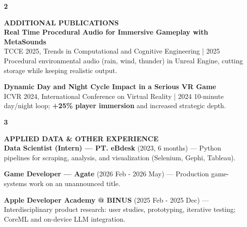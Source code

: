 \documentclass[11pt,a4paper]{article}
\begin{document}
\begin{minipage}[t]{18cm}
\begin{minipage}[t]{17cm}
\end{minipage}

\vspace{0.6cm}

\begin{minipage}[t]{0.8cm}
{\Large\bfseries 2}
\end{minipage}%
\begin{minipage}[t]{17cm}
{\large\bfseries ADDITIONAL PUBLICATIONS}\\[8pt]

\textbf{Real Time Procedural Audio for Immersive Gameplay with MetaSounds}\\
{\small TCCE 2025, Trends in Computational and Cognitive Engineering | 2025 \textbar{} Procedural environmental audio (rain, wind, thunder) in Unreal Engine, cutting storage while keeping realistic output.}

\vspace{0.25cm}

\textbf{Dynamic Day and Night Cycle Impact in a Serious VR Game}\\
{\small ICVR 2024, International Conference on Virtual Reality | 2024 \textbar{} 10-minute day/night loop; \textbf{+25\% player immersion} and increased strategic depth.}

\end{minipage}

\vspace{0.6cm}

\begin{minipage}[t]{0.8cm}
{\Large\bfseries 3}
\end{minipage}%
\begin{minipage}[t]{17cm}
{\large\bfseries APPLIED DATA \& OTHER EXPERIENCE}\\[8pt]

\textbf{Data Scientist (Intern) --- PT. eBdesk} (2023, 6 months) --- Python pipelines for scraping, analysis, and visualization (Selenium, Gephi, Tableau).

\vspace{0.2cm}

\textbf{Game Developer --- Agate} (2026 Feb - 2026 May) --- Production game-systems work on an unannounced title.

\vspace{0.2cm}

\textbf{Apple Developer Academy @ BINUS} (2025 Feb - 2025 Dec) --- Interdisciplinary product research: user studies, prototyping, iterative testing; CoreML and on-device LLM integration.


\end{minipage}
\end{minipage}
\end{document}

